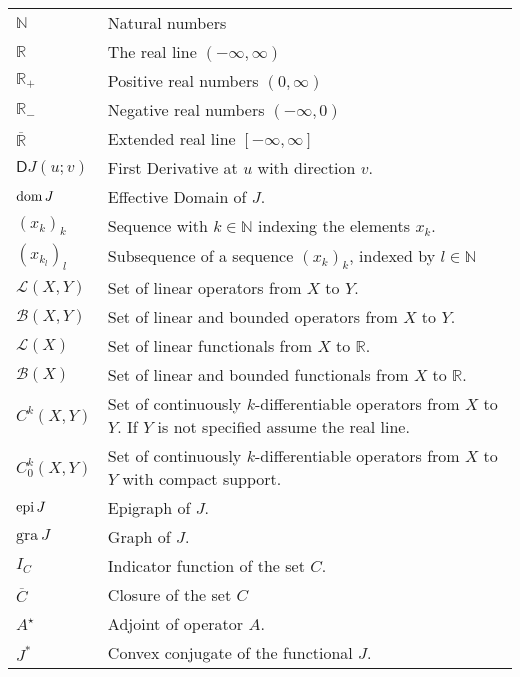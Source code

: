 \begin{tabular}{ll}
	$\mathbb{N}$ & Natural numbers \\
	$\mathbb{R}$ & The real line $(-\infty, \infty)$ \\
	$\mathbb{R}_+$ & Positive real numbers $(0,\infty)$ \\
	$\mathbb{R}_-$ & Negative real numbers $(-\infty,0)$ \\
	$\overline{\mathbb{R}}$ & Extended real line $[-\infty, \infty]$ \\
	$\mathsf{D} J(u;v)$ & First Derivative at $u$ with direction $v$. \\
	$\mathrm{dom\,} J$	& Effective Domain of $J$. \\
	$(x_k)_k$   & Sequence with $k \in \mathbb{N}$ indexing the elements $x_k$. \\
	$(x_{k_l})_l$ & Subsequence of a sequence $(x_k)_k$, indexed by $l \in \mathbb{N}$ \\
	$\mathcal{L}(X,Y)$ & Set of linear operators from $X$ to $Y$. \\
	$\mathcal{B}(X,Y)$ & Set of linear and bounded operators from $X$ to $Y$. \\
	$\mathcal{L}(X)$ & Set of linear functionals from $X$ to $\mathbb{R}$. \\
	$\mathcal{B}(X)$ & Set of linear and bounded functionals from $X$ to $\mathbb{R}$. \\
	$C^k(X,Y)$ & Set of continuously $k$-differentiable operators from $X$ to $Y$. If $Y$ is not specified assume the real line. \\
	$C^k_0(X,Y)$ & Set of continuously $k$-differentiable operators from $X$ to $Y$ with compact support. \\
	$\mathrm{epi\,} J$ & Epigraph of $J$. \\
	$\text{gra}\, J$ & Graph of $J$.\\
	$I_C$ & Indicator function of the set $C$. \\
	$\overline{C}$ & Closure of  the set $C$ \\
	$A^\star$ & Adjoint of operator $A$.\\
	$J^*$ & Convex conjugate of the functional $J$.
\end{tabular}